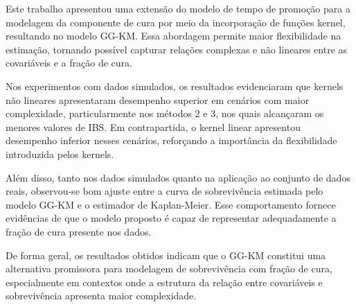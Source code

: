 Este trabalho apresentou uma extensão do modelo de tempo de promoção para a modelagem da componente de cura
por meio da incorporação de funções kernel, resultando no modelo GG-KM. Essa abordagem permite maior flexibilidade
na estimação, tornando possível capturar relações complexas e não lineares entre as covariáveis e a fração
de cura.

Nos experimentos com dados simulados, os resultados evidenciaram que kernels não lineares apresentaram
desempenho superior em cenários com maior complexidade, particularmente nos métodos 2 e 3, nos
quais alcançaram os menores valores de IBS. Em contrapartida, o kernel linear apresentou desempenho inferior
nesses cenários, reforçando a importância da flexibilidade introduzida pelos kernels.

Além disso, tanto nos dados simulados quanto na aplicação ao conjunto de dados reais, observou-se bom ajuste
entre a curva de sobrevivência estimada pelo modelo GG-KM e o estimador de Kaplan-Meier. Esse comportamento
fornece evidências de que o modelo proposto é capaz de representar adequadamente a fração de cura presente
nos dados.

De forma geral, os resultados obtidos indicam que o GG-KM constitui uma alternativa promissora para modelagem
de sobrevivência com fração de cura, especialmente em contextos onde a estrutura da relação entre covariáveis
e sobrevivência apresenta maior complexidade.
